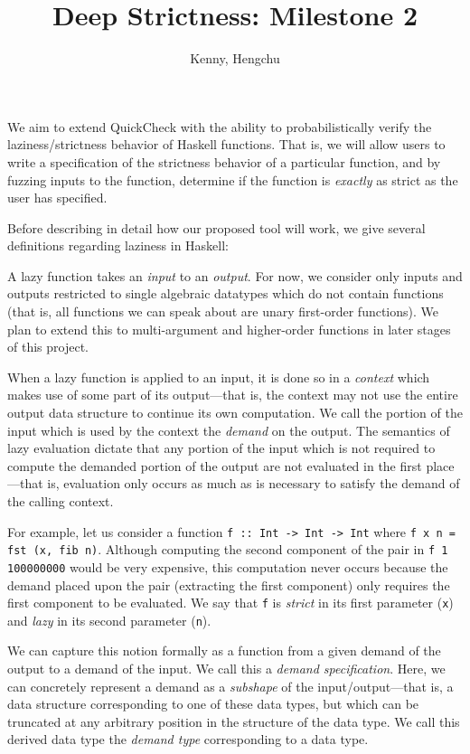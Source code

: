 \documentclass{article}
\title{Deep Strictness: Milestone 2}
\author{Kenny, Hengchu}
\begin{document}
\maketitle

We aim to extend QuickCheck with the ability to probabilistically verify the
laziness/strictness behavior of Haskell functions. That is, we will allow users
to write a specification of the strictness behavior of a particular function,
and by fuzzing inputs to the function, determine if the function is
\emph{exactly} as strict as the user has specified.

Before describing in detail how our proposed tool will work, we give several
definitions regarding laziness in Haskell:

A lazy function takes an \emph{input} to an \emph{output}. For now, we consider
only inputs and outputs restricted to single algebraic datatypes which do not
contain functions (that is, all functions we can speak about are unary
first-order functions). We plan to extend this to multi-argument and
higher-order functions in later stages of this project.

When a lazy function is applied to an input, it is done so in a \emph{context}
which makes use of some part of its output---that is, the context may not use
the entire output data structure to continue its own computation. We call the
portion of the input which is used by the context the \emph{demand} on the
output. The semantics of lazy evaluation dictate that any portion of the input
which is not required to compute the demanded portion of the output are not
evaluated in the first place---that is, evaluation only occurs as much as is
necessary to satisfy the demand of the calling context.

For example, let us consider a function \verb|f :: Int -> Int -> Int| where
\verb|f x n = fst (x, fib n)|. Although computing the second component of the
pair in \verb|f 1 100000000| would be very expensive, this computation never
occurs because the demand placed upon the pair (extracting the first component)
only requires the first component to be evaluated. We say that \verb|f| is
\emph{strict} in its first parameter (\verb|x|) and \emph{lazy} in its second
parameter (\verb|n|).

We can capture this notion formally as a function from a given demand of the
output to a demand of the input. We call this a \emph{demand
  specification}. Here, we can concretely represent a demand as a
\emph{subshape} of the input/output---that is, a data structure corresponding to
one of these data types, but which can be truncated at any arbitrary position in
the structure of the data type. We call this derived data type the \emph{demand
  type} corresponding to a data type.
\end{document}

